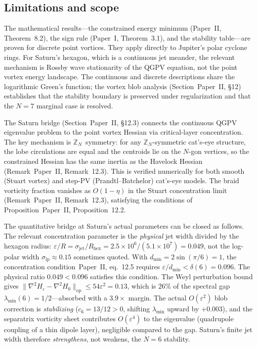 \subsection{Limitations and scope}

The mathematical results---the constrained energy minimum
(Paper~II, Theorem~8.2), the sign rule
(Paper~I, Theorem~3.1), and the stability table---are proven
for discrete point vortices.  They apply directly to Jupiter's polar
cyclone rings.  For Saturn's hexagon, which is a continuous jet meander,
the relevant mechanism is Rossby wave stationarity of the QGPV
equation, not the point vortex energy landscape.  The continuous and
discrete descriptions share the logarithmic Green's function; the
vortex blob analysis (Section~Paper~II, \S12) establishes that the
stability boundary is preserved under regularization and that the
$N = 7$ marginal case is resolved.

The Saturn bridge (Section~Paper~II, \S12.3) connects the
continuous QGPV eigenvalue problem to the point vortex Hessian via
critical-layer concentration.  The key mechanism is
$\mathbb{Z}_N$~symmetry: for any $\mathbb{Z}_N$-symmetric cat's-eye
structure, the lobe circulations are equal and the centroids lie on
the $N$-gon vertices, so the constrained Hessian has the same inertia
as the Havelock Hessian (Remark~Paper~II, Remark~12.3).  This is verified
numerically for both smooth (Stuart vortex) and step-PV
(Prandtl--Batchelor) cat's-eye models.  The braid vorticity fraction
vanishes as $O(1{-}\eta)$ in the Stuart concentration limit
(Remark~Paper~II, Remark~12.3), satisfying the conditions of
Proposition~Paper~II, Proposition~12.2.

The quantitative bridge at Saturn's actual parameters can be closed
as follows.  The relevant concentration parameter is the
\emph{physical} jet width divided by the hexagon radius:
$\varepsilon/R = \sigma_{\mathrm{jet}}/R_{\mathrm{hex}}
= 2.5 \times 10^6/(5.1 \times 10^7) = 0.049$,
not the log-polar width $\sigma_{\mathrm{lp}} \approx 0.15$
sometimes quoted.  With $d_{\min} = 2\sin(\pi/6) = 1$, the
concentration condition~Paper~II, eq.~12.5 requires
$\varepsilon/d_{\min} < \delta(6) = 0.096$.  The physical ratio
$0.049 < 0.096$ satisfies this condition.
The Weyl perturbation bound gives
$\|\nabla^2\!H_\varepsilon - \nabla^2\!H_0\|_{\mathrm{op}}
\le 54\varepsilon^2 = 0.13$, which is $26\%$ of the spectral gap
$\lambda_{\min}(6) = 1/2$---absorbed with a $3.9\times$ margin.
The actual $O(\varepsilon^2)$ blob correction is \emph{stabilizing}
($c_6 = 13/12 > 0$, shifting $\lambda_{\min}$ upward by $+0.003$),
and the separatrix vorticity sheet contributes $O(\varepsilon^4)$
to the eigenvalue (quadrupole coupling of a thin dipole layer),
negligible compared to the gap.  Saturn's finite jet width therefore
\emph{strengthens}, not weakens, the $N = 6$ stability.

